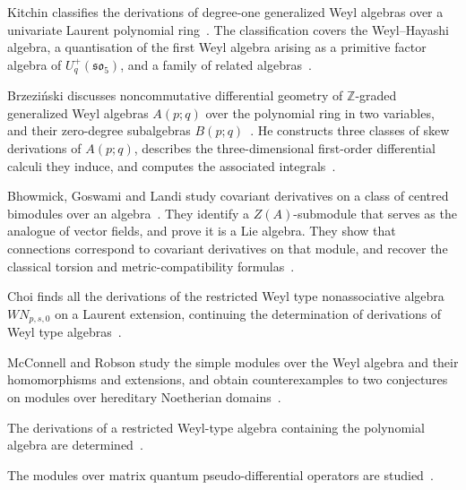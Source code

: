 
Kitchin classifies the derivations of degree-one generalized Weyl algebras
over a univariate Laurent polynomial ring~\cite{WlDerivationsOfQuantumAndInvolut2024}. The classification covers the
Weyl--Hayashi algebra, a quantisation of the first Weyl algebra arising as a
primitive factor algebra
of $U_q^+(\mathfrak{so}_5)$, and a family of related
algebras~\cite{WlDerivationsOfQuantumAndInvolut2024}.

Brzezi\'nski discusses noncommutative differential geometry of
$\mathbb{Z}$-graded generalized Weyl algebras $A(p;q)$ over the polynomial
ring in two variables, and their zero-degree subalgebras $B(p;q)$~\cite{WlNoncommutativeDifferentialGeom2016}. He
constructs
three classes of skew derivations of $A(p;q)$, describes the three-dimensional
first-order differential calculi they induce, and computes the associated
integrals~\cite{WlNoncommutativeDifferentialGeom2016}.

Bhowmick, Goswami and Landi study covariant derivatives on a class of centred
bimodules over an algebra~\cite{WlLeviCivitaConnectionsAndVector2020}. They identify a $Z(A)$-submodule that serves as the
analogue of vector fields, and prove it is a Lie algebra. They show that
connections
correspond to covariant derivatives on that module, and recover the classical
torsion and metric-compatibility
formulas~\cite{WlLeviCivitaConnectionsAndVector2020}.

Choi finds all the derivations of the restricted Weyl type nonassociative
algebra $WN_{p,s,0}$ on a Laurent extension, continuing the determination of
derivations of Weyl type algebras~\cite{WlDerivationsOfARestrictedWeylTy2006}.

McConnell and Robson study the simple modules over the Weyl algebra and their
homomorphisms and extensions, and obtain counterexamples to two conjectures on
modules over hereditary Noetherian
domains~\cite{WlHomomorphismsAndExtensionsOfMo1973}.

The derivations of a restricted Weyl-type algebra containing the polynomial
algebra are determined~\cite{WlDerivationsOfARestrictedWeylTy2020}.

The modules over matrix quantum pseudo-differential operators are
studied~\cite{WlOnModulesOverMatrixQuantumPseu2020}.
